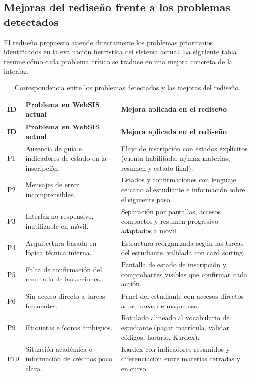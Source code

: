 \subsection{Mejoras del rediseño frente a los problemas detectados}

El rediseño propuesto atiende directamente los problemas prioritarios identificados en la evaluación heurística del sistema actual. La siguiente tabla resume cómo cada problema crítico se traduce en una mejora concreta de la interfaz.

{\small
\setlength{\tabcolsep}{4pt}
\renewcommand{\arraystretch}{1.2}
\begin{longtable}{|p{0.9cm}|p{5.5cm}|p{6.5cm}|}
\hline
\textbf{ID} & \textbf{Problema en WebSIS actual} & \textbf{Mejora aplicada en el rediseño} \\
\hline
\endfirsthead

\hline
\textbf{ID} & \textbf{Problema en WebSIS actual} & \textbf{Mejora aplicada en el rediseño} \\
\hline
\endhead

P1 & Ausencia de guía e indicadores de estado en la inscripción. & Flujo de inscripción con estados explícitos (cuenta habilitada, n/máx materias, resumen y estado final). \\
\hline
P2 & Mensajes de error incomprensibles. & Estados y confirmaciones con lenguaje cercano al estudiante e información sobre el siguiente paso. \\
\hline
P3 & Interfaz no responsive, inutilizable en móvil. & Separación por pantallas, accesos compactos y resumen progresivo adaptados a móvil. \\
\hline
P4 & Arquitectura basada en lógica técnica interna. & Estructura reorganizada según las tareas del estudiante, validada con card sorting. \\
\hline
P5 & Falta de confirmación del resultado de las acciones. & Pantalla de estado de inscripción y comprobantes visibles que confirman cada acción. \\
\hline
P6 & Sin acceso directo a tareas frecuentes. & Panel del estudiante con accesos directos a las tareas de mayor uso. \\
\hline
P9 & Etiquetas e íconos ambiguos. & Rotulado alineado al vocabulario del estudiante (pagar matrícula, validar códigos, horario, Kardex). \\
\hline
P10 & Situación académica e información de créditos poco clara. & Kardex con indicadores resumidos y diferenciación entre materias cerradas y en curso. \\
\hline

\caption{Correspondencia entre los problemas detectados y las mejoras del rediseño.}\label{tab:resultados-mejoras}
\end{longtable}
}

